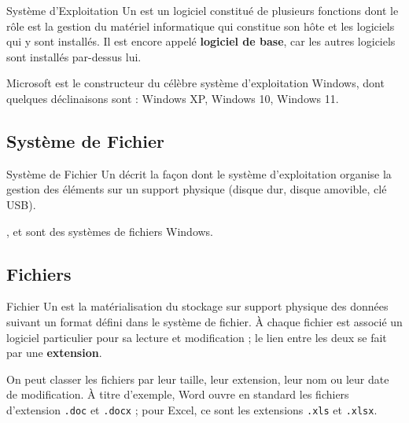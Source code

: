 \begin{boxdef}{Système d'Exploitation}
Un  est un logiciel constitué de plusieurs fonctions
dont le rôle est la gestion du matériel informatique qui constitue son hôte et les
logiciels qui y sont installés. Il est encore appelé \textbf{logiciel de base}, car les
autres logiciels sont installés par-dessus lui.
\end{boxdef}

Microsoft est le constructeur du célèbre système d'exploitation Windows, dont quelques
déclinaisons sont : Windows XP, Windows 10, Windows 11.

\subsection{Système de Fichier}

\begin{boxdef}{Système de Fichier}
Un  décrit la façon dont le système d'exploitation
organise la gestion des éléments sur un support physique (disque dur, disque
amovible, clé USB).
\end{boxdef}

,  et  sont des systèmes de fichiers Windows.

\subsection{Fichiers}

\begin{boxdef}{Fichier}
Un  est la matérialisation du stockage sur support physique des
données suivant un format défini dans le système de fichier. À chaque fichier est
associé un logiciel particulier pour sa lecture et modification ; le lien entre les deux
se fait par une \textbf{extension}.
\end{boxdef}

On peut classer les fichiers par leur taille, leur extension, leur nom ou leur date de
modification. À titre d'exemple, Word ouvre en standard les fichiers d'extension
\texttt{.doc} et \texttt{.docx} ; pour Excel, ce sont les extensions \texttt{.xls} et
\texttt{.xlsx}.

